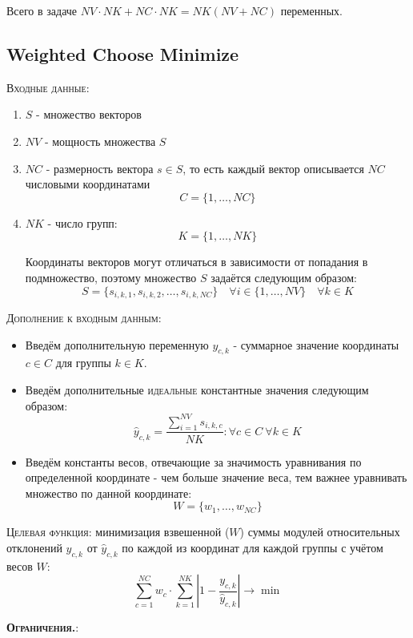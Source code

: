 \documentclass[%
10pt, %
final, %
oneside, %
onecolumn, %
centertags]{article} %
\theoremstyle{plain}
\theoremstyle{definition}
\theoremstyle{remark}
\begin{document}
Всего в задаче $NV\cdot NK + NC\cdot NK = NK(NV+NC)$ переменных.


\newpage
\subsection{Weighted Choose Minimize}

\textsc{Входные данные}: 
\begin{enumerate}
	\item $S$ - множество векторов
	\item $NV$ - мощность множества $S$
	\item $NC$ - размерность вектора $s \in S$, то есть каждый вектор описывается $NC$ числовыми координатами
	$$C = \{1,\ldots,NC\}$$
	\item $NK$ - число групп:
	$$K = \{1,\ldots,NK\}$$

	Координаты векторов могут отличаться в зависимости от попадания в подмножество, поэтому множество $S$ задаётся следующим образом:
	$$S = \{s_{i,k,1},s_{i,k,2},\ldots,s_{i,k,NC}\} \quad \forall i \in \{1,\ldots,NV\} \quad \forall k \in K$$
	
\end{enumerate}
\textsc{Дополнение к входным данным}:
\begin{itemize}
	\item Введём дополнительную переменную $y_{c,k}$ - суммарное значение координаты $c \in C$ для группы $k \in K$.
	\item Введём дополнительные \textsc{идеальные} константные значения следующим образом:
	$$\hat{y}_{c,k} = \frac{\sum\limits_{i=1}^{NV}s_{i,k,c}}{NK} : \forall c \in C \ \forall k \in K$$
	\item Введём константы весов, отвечающие за значимость уравнивания по определенной координате - чем больше значение веса, тем важнее уравнивать множество по данной координате:
	$$W = \{w_1,\ldots,w_{NC}\}$$
\end{itemize}

\textsc{Целевая функция:} минимизация взвешенной ($W$) суммы модулей относительных отклонений $y_{c,k}$ от $\hat{y}_{c,k}$ по каждой из координат для каждой группы с учётом весов $W$:
$$\sum\limits_{c=1}^{NC} w_c \cdot \sum\limits_{k=1}^{NK}  \left\vert 1 - \frac{y_{c,k}}{\hat{y}_{c,k}}\right\vert \to \min$$

\newpage
\textbf{\textsc{Ограничения.}}:
\end{document}
